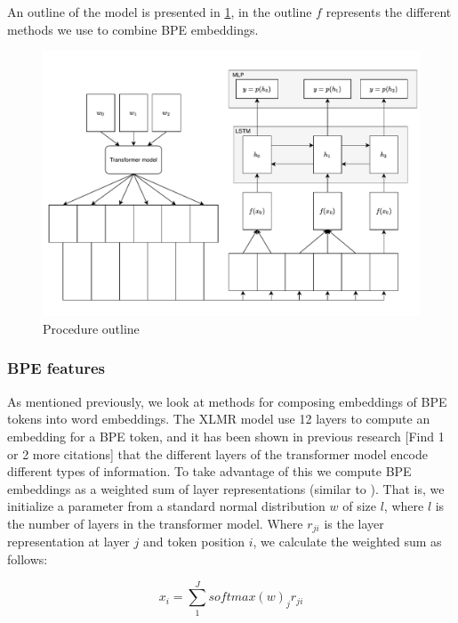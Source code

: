 \documentclass[11pt]{article}
\begin{document}
	An outline of the model is presented in \cref{fig:model}, in
        the outline $f$ represents the different methods we use to
        combine BPE embeddings.
	
	\begin{figure}[h!]
		\centering
		\includegraphics[scale=0.5]{model-outline.pdf}
		\caption{\label{fig:model} Procedure outline}
	\end{figure}
	
	\subsubsection{BPE features}

             As mentioned previously, we look at methods for composing
     embeddings of BPE tokens into word embeddings. The XLMR model use
     12 layers to compute an embedding for a BPE token, and it has
     been shown in previous research
     \cite{kondratyukstraka,raganato2018analysis} [Find 1 or 2 more
     citations] that the different layers of the transformer model
     encode different types of information. To take advantage of this
     we compute BPE embeddings as a weighted sum of layer
     representations (similar to \cite{kondratyukstraka}).  That is,
     we initialize a parameter from a standard normal distribution $w$
     of size $l$, where $l$ is the number of layers in the transformer
     model. Where $r_{ji}$ is the layer representation at layer $j$
     and token position $i$, we calculate the weighted sum as follows:

    \begin{equation}
		x_i = \sum_{1}^{J} softmax(w)_j r_{ji}
	\end{equation}
\end{document}
